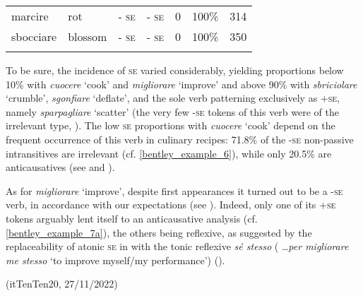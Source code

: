 \documentclass[output=paper,colorlinks,citecolor=brown
]{langscibook}
\begin{document}
\begin{table}[hbt!]
{\begin{tabular}{|p{}|p{}||p{}|p{}||p{}|p{}||p{}|}
marcire      & rot       & - \textsc{se}                                                                                     & - \textsc{se}                                                                          & 0                                 & 100\%                                     & 314                 \\
sbocciare    & blossom   & - \textsc{se}                                                                                     & - \textsc{se}                                                                          & 0                                 & 100\%                                     & 350    \\   \lspbottomrule         
\end{tabular}}
\end{table}

To be sure, the incidence of \textsc{se} varied considerably, yielding proportions below 10\% with \textit{cuocere} ‘cook’ and \textit{migliorare} ‘improve’ and above 90\% with \textit{sbriciolare} ‘crumble’, \textit{sgonfiare} ‘deflate’, and the sole verb patterning exclusively as +\textsc{se}, namely \textit{sparpagliare} ‘scatter’ (the very few -\textsc{se} tokens of this verb were of the irrelevant type, ). The low \textsc{se} proportions with \textit{cuocere} ‘cook’ depend on the frequent occurrence of this verb in culinary recipes: 71.8\% of the -\textsc{se} non-passive intransitives are irrelevant (cf. \ref{bentley_example_6}), while only 20.5\% are anticausatives (see  and ).

As for \textit{migliorare} ‘improve’, despite first appearances it turned out to be a -\textsc{se} verb, in accordance with our expectations (see ). Indeed, only one of its +\textsc{se} tokens arguably lent itself to an anticausative analysis (cf. \ref{bentley_example_7a}), the others being reflexive, as suggested by the replaceability of atonic \textsc{se} in  with the tonic reflexive \textit{sé stesso} ( \ldots  \textit{per migliorare me stesso} ‘to improve myself/my performance’) ().

\hspace*{\fill}(itTenTen20, 27/11/2022)\quad
\end{document}
